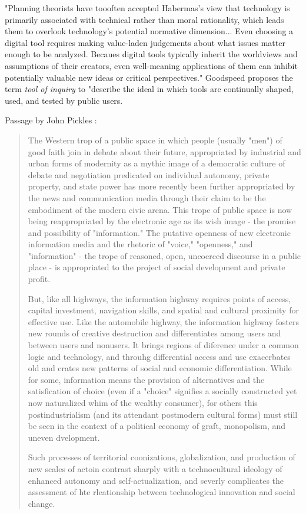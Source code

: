 "Planning theorists have toooften accepted Habermas's view that technology is primarily associated with technical rather than moral rationality, which leads them to overlook technology's potential normative dimension... Even choosing a digital tool requires making value-laden judgements about what issues matter enough to be analyzed. Becaues digital tools typically inherit the worldviews and assumptions of their creators, even well-meaning applications of them can inhibit potentially valuable new ideas or critical perspectives." Goodspeed proposes the term \textit{tool of inquiry} to "describe the ideal in which tools are continually shaped, used, and tested by public users. \cite{goodspeedScenarioPlanningCities2020}

Passage by John Pickles \cite{picklesGroundTruthSocial1994}:

\blockquote{The Western trop of a public space in which people (usually "men") of good faith join in debate about their future, appropriated by industrial and urban forms of modernity as a mythic image of a democratic culture of debate and negotiation predicated on individual autonomy, private property, and state power has more recently been further appropriated by the news and communication media through their claim to be the embodiment of the modern civic arena. This trope of public space is now being reappropriated by the electronic age as its wish image - the promise and possibility of "information." The putative openness of new electronic information media and the rhetoric of "voice," "openness," and "information" - the trope of reasoned, open, uncoerced discourse in a public place - is appropriated to the project of social development and private profit.

But, like all highways, the information highway requires points of access, capital investment, navigation skills, and spatial and cultural proximity for effective use. Like the automobile highway, the information highway fosters new rounds of creative destruction and differentiates among users and between users and nonusers. It brings regions of diference under a common logic and technology, and throuhg differential access and use exacerbates old and crates new patterns of social and economic differentiation. While for some, information means the provision of alternatives and the satisfication of choice (even if a "choice" signifies a socially constructed yet now naturalized whim of the wealthy consumer), for others this postindustrialism (and its attendant postmodern cultural forms) must still be seen in the context of a political economy of graft, monopolism, and uneven dvelopment.

Such processes of territorial coonizations, globalization, and production of new scales of actoin contrast sharply with a technocultural ideology of enhanced autonomy and self-actualization, and severly complicates the assessment of hte rleationship between technological innovation and social change.}

